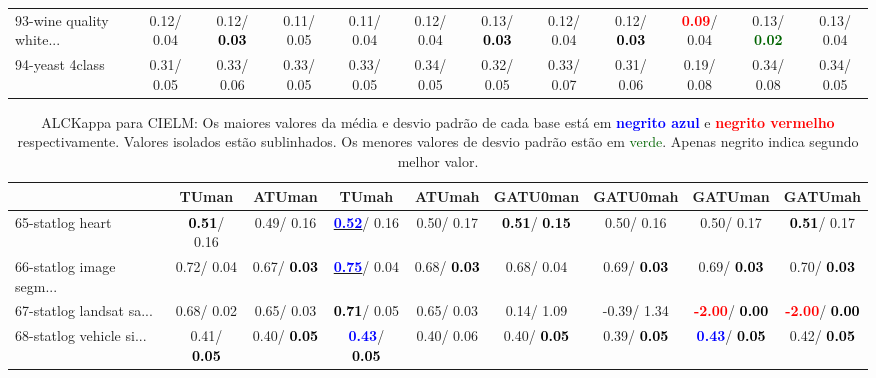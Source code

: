 \begin{table}[h]
\begin{center}
{\begin{tabular}{lc|c|c|c|c|c|c|c|c|c|c}
93-wine quality white... &   0.12/  0.04 &   0.12/\textcolor{black}{\textbf{  0.03}} &   0.11/  0.05 &   0.11/  0.04 &   0.12/  0.04 &   0.13/\textcolor{black}{\textbf{  0.03}} &   0.12/  0.04 &   0.12/\textcolor{black}{\textbf{  0.03}} & \textcolor{red}{\textbf{  0.09}}/  0.04 &   0.13/\textcolor{darkgreen}{\textbf{  0.02}} &   0.13/  0.04 \\
94-yeast 4class &   0.31/  0.05 &   0.33/  0.06 &   0.33/  0.05 &   0.33/  0.05 &   0.34/  0.05 &   0.32/  0.05 &   0.33/  0.07 &   0.31/  0.06 &   0.19/  0.08 &   0.34/  0.08 &   0.34/  0.05 \\\end{tabular}}\label{stratsALCKappa2aCIELM}
\end{center}
\end{table}
\begin{table}[h]
\caption{ALCKappa para CIELM: Os maiores valores da média e desvio padrão de cada base está em \textcolor{blue}{\textbf{negrito azul}} e \textcolor{red}{\textbf{negrito vermelho}} respectivamente. Valores isolados estão sublinhados. Os menores valores de desvio padrão estão em \textcolor{darkgreen}{verde}. Apenas negrito indica segundo melhor valor.}
\begin{center}\begin{tabular}{lc|c|c|c|c|c|c|c}
 & TUman & \textbf{ATUman} & TUmah & \textbf{ATUmah} & GATU0man & GATU0mah & GATUman & GATUmah\\ \hline 65-statlog heart & \textcolor{black}{\textbf{  0.51}}/  0.16 &   0.49/  0.16 & \underline{\textcolor{blue}{\textbf{  0.52}}}/  0.16 &   0.50/  0.17 & \textcolor{black}{\textbf{  0.51}}/\textcolor{black}{\textbf{  0.15}} &   0.50/  0.16 &   0.50/  0.17 & \textcolor{black}{\textbf{  0.51}}/  0.17 \\
66-statlog image segm... &   0.72/  0.04 &   0.67/\textcolor{black}{\textbf{  0.03}} & \underline{\textcolor{blue}{\textbf{  0.75}}}/  0.04 &   0.68/\textcolor{black}{\textbf{  0.03}} &   0.68/  0.04 &   0.69/\textcolor{black}{\textbf{  0.03}} &   0.69/\textcolor{black}{\textbf{  0.03}} &   0.70/\textcolor{black}{\textbf{  0.03}} \\
67-statlog landsat sa... &   0.68/  0.02 &   0.65/  0.03 & \textcolor{black}{\textbf{  0.71}}/  0.05 &   0.65/  0.03 &   0.14/  1.09 &  -0.39/  1.34 & \textcolor{red}{\textbf{ -2.00}}/\textcolor{black}{\textbf{  0.00}} & \textcolor{red}{\textbf{ -2.00}}/\textcolor{black}{\textbf{  0.00}} \\
68-statlog vehicle si... &   0.41/\textcolor{black}{\textbf{  0.05}} &   0.40/\textcolor{black}{\textbf{  0.05}} & \textcolor{blue}{\textbf{  0.43}}/\textcolor{black}{\textbf{  0.05}} &   0.40/  0.06 &   0.40/\textcolor{black}{\textbf{  0.05}} &   0.39/\textcolor{black}{\textbf{  0.05}} & \textcolor{blue}{\textbf{  0.43}}/\textcolor{black}{\textbf{  0.05}} &   0.42/\textcolor{black}{\textbf{  0.05}} \\

\end{tabular}
\end{center}
\end{table}

